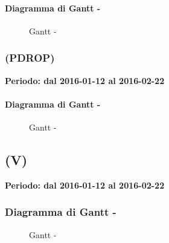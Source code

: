 \documentclass[./PianoDiProgetto.tex]{subfiles}
\begin{document}
  \paragraph{Diagramma di Gantt - \PerPDRD}
    \begin{figure}[!h]
    \centering
    \caption{Gantt - \PerPDRD}
    \end{figure}

  \subsubsection{\PerPDROP{} (PDROP)}
  \textbf{Periodo: dal 2016-01-12 al 2016-02-22}

  \paragraph{Diagramma di Gantt - \PerPDROP}
    \begin{figure}[!h]
    \centering
    \caption{Gantt - \PerPDROP}
    \end{figure}

  \subsection{\PerV (V)}
  \textbf{Periodo: dal 2016-01-12 al 2016-02-22}

  \subsubsection{Diagramma di Gantt - \PerV}
    \begin{figure}[!h]
    \centering
    \caption{Gantt - \PerV}
    \end{figure}
\end{document}
